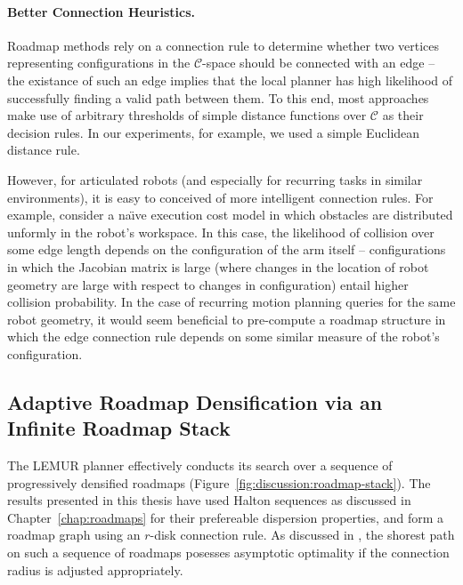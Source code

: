 \paragraph{Better Connection Heuristics.}
Roadmap methods rely on a connection rule to determine whether
two vertices representing configurations in the $\mathcal{C}$-space
should be connected with an edge
-- the existance of such an edge implies that the local planner
has high likelihood of successfully finding a valid path between them.
To this end,
most approaches make use of arbitrary thresholds of
simple distance functions over $\mathcal{C}$ as their decision rules.
In our experiments, for example,
we used a simple Euclidean distance rule.

However, for articulated robots
(and especially for recurring tasks in similar environments),
it is easy to conceived of more intelligent connection rules.
For example, consider a na\"{\i}ve execution cost model in which
obstacles are distributed unformly in the robot's workspace.
In this case,
the likelihood of collision over some edge length
depends on the configuration of the arm itself
-- configurations in which the Jacobian matrix is large
(where changes in the location of robot geometry are large
with respect to changes in configuration)
entail higher collision probability.
In the case of recurring motion planning queries for the same
robot geometry,
it would seem beneficial to pre-compute a roadmap structure
in which the edge connection rule depends on some similar measure
of the robot's configuration.


\subsection{Adaptive Roadmap Densification via an Infinite Roadmap Stack}
\label{subsec:conclusion:infinite-stack}

\label{sec:discussion:disc}
The LEMUR planner effectively conducts its search over a sequence of
progressively densified roadmaps
(Figure~\ref{fig:discussion:roadmap-stack}).
The results presented in this thesis have used Halton sequences
as discussed in Chapter~\ref{chap:roadmaps}
for their prefereable dispersion properties,
and form a roadmap graph using an $r$-disk connection rule.
As discussed in \citep{janson2015deterministicsampling},
the shorest path on such a sequence of roadmaps
posesses asymptotic optimality if the connection radius is adjusted
appropriately.


